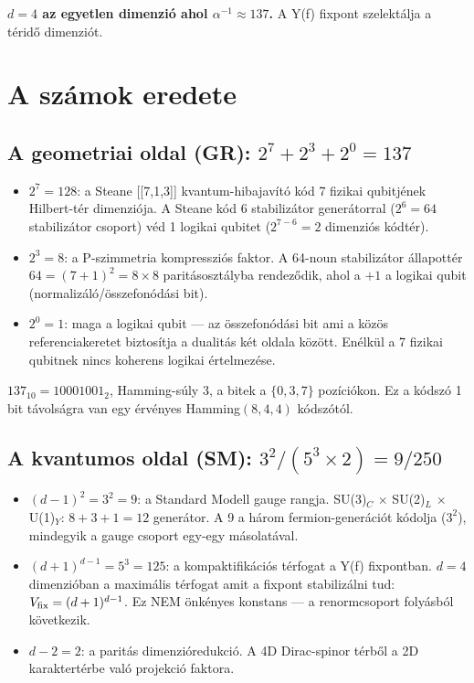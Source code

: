 \documentclass[11pt,a4paper,twoside]{book}
\begin{document}
\textbf{$d=4$ az egyetlen dimenzió ahol $\alpha^{-1} \approx 137$.} A Y(f) fixpont szelektálja a téridő dimenziót.

\chapter{A számok eredete}

\section{A geometriai oldal (GR): $2^7 + 2^3 + 2^0 = 137$}

\begin{itemize}
  \item $2^7 = 128$: a Steane [[7,1,3]] kvantum-hibajavító kód 7 fizikai qubitjének Hilbert-tér dimenziója. A Steane kód 6 stabilizátor generátorral ($2^6 = 64$ stabilizátor csoport) véd 1 logikai qubitet ($2^{7-6}=2$ dimenziós kódtér).
  \item $2^3 = 8$: a P-szimmetria kompressziós faktor. A 64-noun stabilizátor állapottér $64 = (7+1)^2 = 8\times 8$ paritásosztályba rendeződik, ahol a $+1$ a logikai qubit (normalizáló/összefonódási bit).
  \item $2^0 = 1$: maga a logikai qubit — az összefonódási bit ami a közös referenciakeretet biztosítja a dualitás két oldala között. Enélkül a 7 fizikai qubitnek nincs koherens logikai értelmezése.
\end{itemize}

$137_{10} = 10001001_2$, Hamming-súly 3, a bitek a $\{0, 3, 7\}$ pozíciókon. Ez a kódszó 1 bit távolságra van egy érvényes Hamming$(8,4,4)$ kódszótól.

\section{A kvantumos oldal (SM): $3^2/(5^3 \times 2) = 9/250$}

\begin{itemize}
  \item $(d-1)^2 = 3^2 = 9$: a Standard Modell gauge rangja. SU(3)$_C$ $\times$ SU(2)$_L$ $\times$ U(1)$_Y$: $8 + 3 + 1 = 12$ generátor. A 9 a három fermion-generációt kódolja ($3^2$), mindegyik a gauge csoport egy-egy másolatával.
  \item $(d+1)^{d-1} = 5^3 = 125$: a kompaktifikációs térfogat a Y(f) fixpontban. $d=4$ dimenzióban a maximális térfogat amit a fixpont stabilizálni tud: $V_{\rm fix} = (d+1)^{d-1}$. Ez NEM önkényes konstans — a renormcsoport folyásból következik.
  \item $d-2 = 2$: a paritás dimenzióredukció. A 4D Dirac-spinor térből a 2D karaktertérbe való projekció faktora.
\end{itemize}
\end{document}

